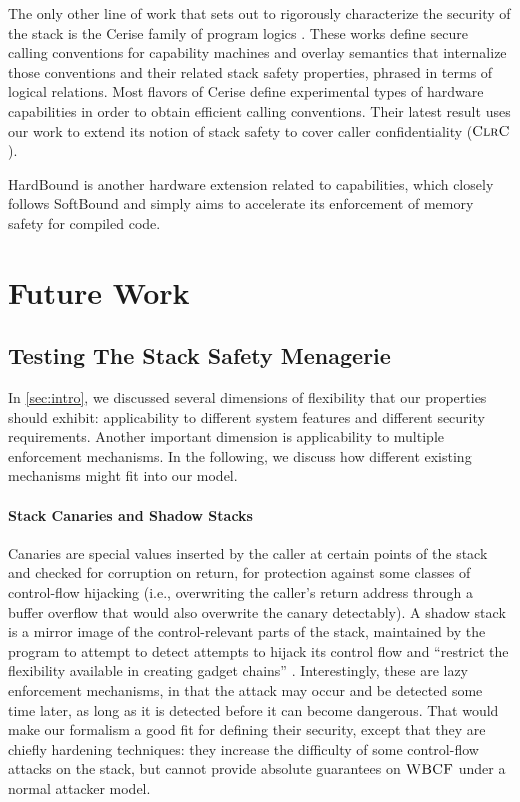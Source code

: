 \documentclass[10pt,conference]{ieeetran}%
\theoremstyle{definition}
\begin{document}
The only other line of work that sets out to rigorously characterize the
security of the stack is the Cerise family of program logics
\cite{SkorstengaardLocal, SkorstengaardSTKJFP, Georges22:TempsDesCerises}.
These works define secure calling conventions for capability machines and
overlay semantics that internalize those conventions and their related stack
safety properties, phrased in terms of logical relations. Most flavors of
Cerise define experimental types of hardware capabilities in order to obtain
efficient calling conventions. Their latest result
\cite{Georges22:TempsDesCerises} uses our work to extend its notion of stack
safety to cover caller confidentiality (\(\textnormal{\sc ClrC}\)).

HardBound \cite{DeviettiBMZ08} is another hardware extension related to
capabilities, which closely follows SoftBound \cite{NagarakatteZMZ09} and
simply aims to accelerate its enforcement of memory safety for compiled code.

\section{Future Work}
\label{sec:future}

\subsection{Testing The Stack Safety Menagerie}

In \cref{sec:intro}, we discussed several dimensions of flexibility
that our properties should exhibit: applicability to different system
features and different security requirements. Another important dimension
is applicability to multiple enforcement mechanisms.
In the following, we discuss how different existing mechanisms
might fit into our model.

\paragraph{Stack Canaries and Shadow Stacks}
%
Canaries are special values inserted by the caller at certain points of the
stack and checked for corruption on return, for protection against
some classes of control-flow hijacking (i.e., overwriting the caller's
return address through a buffer overflow that would also overwrite the canary
detectably). A shadow stack is a mirror image of the control-relevant parts of the stack,
maintained by the program to attempt to detect attempts to hijack its control
flow and ``restrict the flexibility available in creating gadget chains''
\cite{Shanbhogue+19}.
%
Interestingly, these are lazy enforcement mechanisms, in that
the attack may occur and be detected some time later, as long as
it is detected before it can become dangerous. That would make our
formalism a good fit for defining their security, except that
they are chiefly hardening techniques: they increase the difficulty
of some control-flow attacks on the stack, but cannot provide absolute
guarantees on \(\textnormal{\sc WBCF}\) under a normal attacker model.
\end{document}
